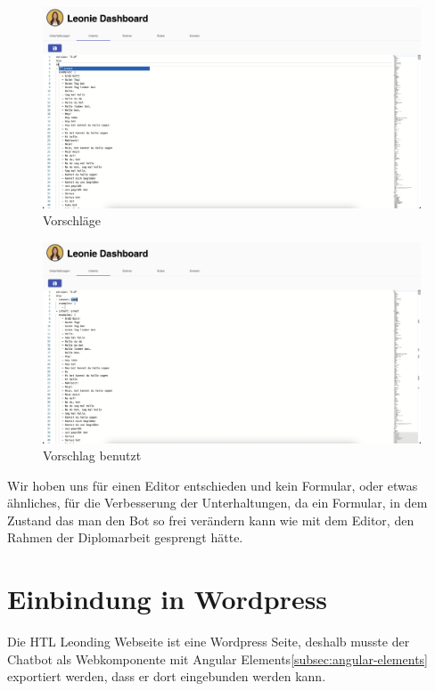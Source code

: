 \begin{figure}[hbt!]
    \centering
    \includegraphics[scale=0.2]{pics/dashboardCodeSuggestion}
    \caption{Vorschläge}
    \label{fig:impl:dashboardCodeSuggestion}
\end{figure}
\begin{figure}[hbt!]
    \centering
    \includegraphics[scale=0.2]{pics/dashboardSuggestionMade}
    \caption{Vorschlag benutzt}
    \label{fig:impl:dashboardCodeSuggestionMade}
\end{figure}

Wir hoben uns für einen Editor entschieden und kein Formular, oder etwas ähnliches, für die Verbesserung der Unterhaltungen, da ein Formular, in dem Zustand das man den Bot so frei verändern kann wie mit dem Editor, den Rahmen der Diplomarbeit gesprengt hätte.

\section{Einbindung in Wordpress}
Die HTL Leonding Webseite ist eine Wordpress Seite, deshalb musste der Chatbot als Webkomponente mit Angular Elements\ref{subsec:angular-elements} exportiert werden, dass er dort eingebunden werden kann.

